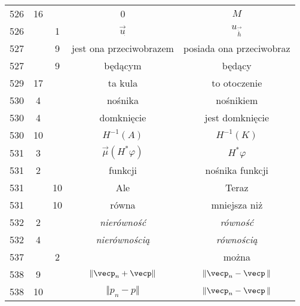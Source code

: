 \documentclass[a4paper,11pt]{article}
\numberwithin{equation}{section}
\begin{document}
\begin{center}
\begin{tabular}{|c|c|c|c|c|}
    526 & 16 & & 0 & $M$ \\
    526 & &  1 & $\overrightarrow{ u }_{ \dot{ } }$
           & $u_{ \overrightarrow{ \dot{ h } } }$ \\
    527 & &  9 & jest ona przeciwobrazem & posiada ona przeciwobraz \\
    527 & &  9 & będącym & będący \\
    529 & 17 & & ta kula & to otoczenie \\
    530 &  4 & & nośnika & nośnikiem \\
    530 &  4 & & domknięcie & jest domknięcie \\
    530 & 10 & & $H^{ -1 }( A )$ & $H^{ -1 }( K )$ \\
    531 &  3 & & $\vec{ \mu }( H^{ * } \varphi )$ & $H^{ * } \varphi$ \\
    531 &  2 & & funkcji & nośnika funkcji \\
    531 & & 10 & Ale & Teraz \\
    531 & & 10 & równa & mniejsza niż \\
    532 &  2 & & \textit{nierówność} & \textit{równość} \\
    532 &  4 & & \textit{nierównością} & \textit{równością} \\
    537 & &  2 & & można \\
    538 &  9 & & $\Vert \vecp_{ n } + \vecp \Vert$
           & $\Vert \vecp_{ n } - \vecp \, \Vert$ \\
    538 & 10 & & $\Vert p_{ n } - p \Vert$
           & $\Vert \vecp_{ n } - \vecp \, \Vert$ \\
    \hline
  \end{tabular}






\end{center}
\end{document}
